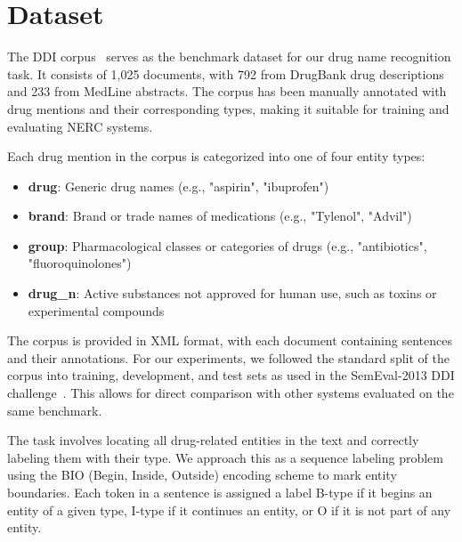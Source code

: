 \section{Dataset}
\label{sec:dataset}

The DDI corpus~\cite{ddi-corpus} serves as the benchmark dataset for our drug name recognition task. It consists of 1,025 documents, with 792 from DrugBank drug descriptions and 233 from MedLine abstracts. The corpus has been manually annotated with drug mentions and their corresponding types, making it suitable for training and evaluating NERC systems.

Each drug mention in the corpus is categorized into one of four entity types:
\begin{itemize}
    \item \textbf{drug}: Generic drug names (e.g., "aspirin", "ibuprofen")
    \item \textbf{brand}: Brand or trade names of medications (e.g., "Tylenol", "Advil")
    \item \textbf{group}: Pharmacological classes or categories of drugs (e.g., "antibiotics", "fluoroquinolones")
    \item \textbf{drug\_n}: Active substances not approved for human use, such as toxins or experimental compounds
\end{itemize}

The corpus is provided in XML format, with each document containing sentences and their annotations. For our experiments, we followed the standard split of the corpus into training, development, and test sets as used in the SemEval-2013 DDI challenge~\cite{semeval2013}. This allows for direct comparison with other systems evaluated on the same benchmark.

The task involves locating all drug-related entities in the text and correctly labeling them with their type. We approach this as a sequence labeling problem using the BIO (Begin, Inside, Outside) encoding scheme to mark entity boundaries. Each token in a sentence is assigned a label B-type if it begins an entity of a given type, I-type if it continues an entity, or O if it is not part of any entity.
